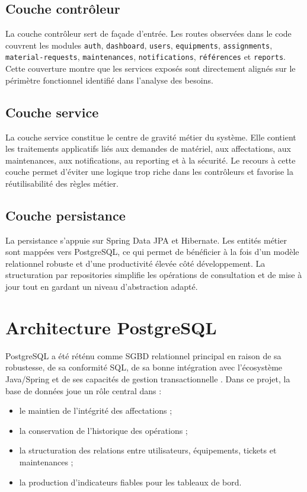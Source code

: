﻿\documentclass[12pt,a4paper,oneside]{report}
\begin{document}
\subsection{Couche contrôleur}
La couche contrôleur sert de façade d'entrée. Les routes observées dans le code couvrent les modules \texttt{auth}, \texttt{dashboard}, \texttt{users}, \texttt{equipments}, \texttt{assignments}, \texttt{material-requests}, \texttt{maintenances}, \texttt{notifications}, \texttt{références} et \texttt{reports}. Cette couverture montre que les services exposés sont directement alignés sur le périmètre fonctionnel identifié dans l'analyse des besoins.

\subsection{Couche service}
La couche service constitue le centre de gravité métier du système. Elle contient les traitements applicatifs liés aux demandes de matériel, aux affectations, aux maintenances, aux notifications, au reporting et à la sécurité. Le recours à cette couche permet d'éviter une logique trop riche dans les contrôleurs et favorise la réutilisabilité des règles métier.

\subsection{Couche persistance}
La persistance s'appuie sur Spring Data JPA et Hibernate. Les entités métier sont mappées vers PostgreSQL, ce qui permet de bénéficier à la fois d'un modèle relationnel robuste et d'une productivité élevée côté développement. La structuration par repositories simplifie les opérations de consultation et de mise à jour tout en gardant un niveau d'abstraction adapté.

\section{Architecture PostgreSQL}
PostgreSQL a été réténu comme SGBD relationnel principal en raison de sa robustesse, de sa conformité SQL, de sa bonne intégration avec l'écosystème Java/Spring et de ses capacités de gestion transactionnelle \cite{postgresdocs}. Dans ce projet, la base de données joue un rôle central dans :
\begin{itemize}
  \item le maintien de l'intégrité des affectations ;
  \item la conservation de l'historique des opérations ;
  \item la structuration des relations entre utilisateurs, équipements, tickets et maintenances ;
  \item la production d'indicateurs fiables pour les tableaux de bord.
\end{itemize}
\end{document}
